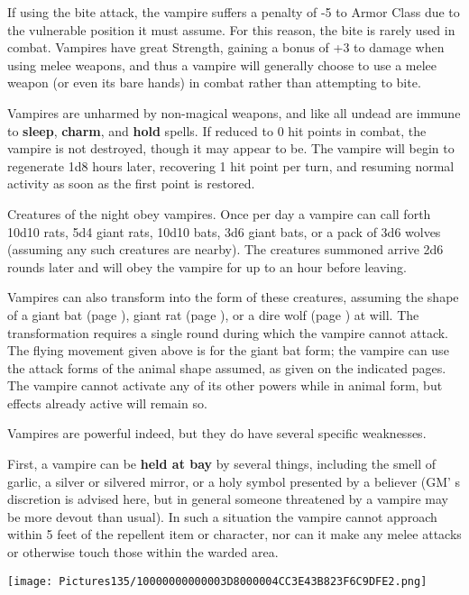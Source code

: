 \documentclass[a4paper,twoside,openany,10pt]{book}
\begin{document}
\begin{multicols}{2}
If using the bite attack, the vampire suffers a penalty of -5 to Armor Class due to the vulnerable position it must assume. For this reason, the bite is rarely used in combat. Vampires have great Strength, gaining a bonus of +3 to damage when using melee weapons, and thus a vampire will generally choose to use a melee weapon (or even its bare hands) in combat rather than attempting to bite.

Vampires are unharmed by non-magical weapons, and like all undead are immune to \textbf{sleep}, \textbf{charm},\textbf{ }and \textbf{hold }spells. If reduced to 0 hit points in combat, the vampire is not destroyed, though it may appear to be. The vampire will begin to regenerate 1d8 hours later, recovering 1 hit point per turn, and resuming normal activity as soon as the first point is restored.

Creatures of the night obey vampires. Once per day a vampire can call forth 10d10 rats, 5d4 giant rats, 10d10 bats, 3d6 giant bats, or a pack of 3d6 wolves (assuming any such creatures are nearby). The creatures summoned arrive 2d6 rounds later and will obey the vampire for up to an hour before leaving. 

Vampires can also transform into the form of these creatures, assuming the shape of a giant bat (page \hyperlink{bat-and-bat-giant}{\pageref{bat-and-bat-giant}}), giant rat (page \hyperlink{rat-and-rat-giant}{\pageref{rat-and-rat-giant}}), or a dire wolf (page \hyperlink{wolf-and-wolf-dire}{\pageref{wolf-and-wolf-dire}}) at will. The transformation requires a single round during which the vampire cannot attack. The flying movement given above is for the giant bat form; the vampire can use the attack forms of the animal shape assumed, as given on the indicated pages. The vampire cannot activate any of its other powers while in animal form, but effects already active will remain so. 

Vampires are powerful indeed, but they do have several specific weaknesses.

First, a vampire can be \textbf{held at bay} by several things, including the smell of garlic, a silver or silvered mirror, or a holy symbol presented by a believer (GM' s discretion is advised here, but in general someone threatened by a vampire may be more devout than usual). In such a situation the vampire cannot approach within 5 feet of the repellent item or character, nor can it make any melee attacks or otherwise touch those within the warded area. 

\begin{center} \texttt{[image: Pictures135/10000000000003D8000004CC3E43B823F6C9DFE2.png]} \end{center}


\end{multicols}
\end{document}
